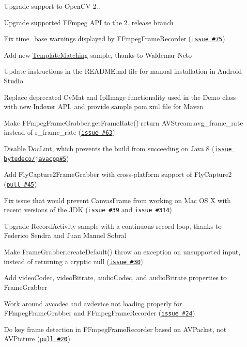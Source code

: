 
\begin{DoxyItemize}
\item Upgrade support to Open\+C\+V 2..
\item Upgrade supported F\+Fmpeg A\+P\+I to the 2. release branch
\item Fix {\ttfamily time\+\_\+base} warnings displayed by {\ttfamily F\+Fmpeg\+Frame\+Recorder} (\href{https://github.com/bytedeco/javacv/issues/75}{\tt issue \#75})
\item Add new {\ttfamily \hyperlink{class_template_matching}{Template\+Matching}} sample, thanks to Waldemar Neto
\item Update instructions in the {\ttfamily R\+E\+A\+D\+M\+E.\+md} file for manual installation in Android Studio
\item Replace deprecated {\ttfamily Cv\+Mat} and {\ttfamily Ipl\+Image} functionality used in the {\ttfamily Demo} class with new {\ttfamily Indexer} A\+P\+I, and provide sample {\ttfamily pom.\+xml} file for Maven
\item Make {\ttfamily F\+Fmpeg\+Frame\+Grabber.\+get\+Frame\+Rate()} return {\ttfamily A\+V\+Stream.\+avg\+\_\+frame\+\_\+rate} instead of {\ttfamily r\+\_\+frame\+\_\+rate} (\href{https://github.com/bytedeco/javacv/issues/63}{\tt issue \#63})
\item Disable Doc\+Lint, which prevents the build from succeeding on Java 8 (\href{https://github.com/bytedeco/javacpp/issues/5}{\tt issue bytedeco/javacpp\#5})
\item Add {\ttfamily Fly\+Capture2\+Frame\+Grabber} with cross-\/platform support of Fly\+Capture2 (\href{https://github.com/bytedeco/javacv/pull/45}{\tt pull \#45})
\item Fix issue that would prevent {\ttfamily Canvas\+Frame} from working on Mac O\+S X with recent versions of the J\+D\+K (\href{https://github.com/bytedeco/javacv/issues/39}{\tt issue \#39} and \href{http://code.google.com/p/javacv/issues/detail?id=314}{\tt issue \#314})
\item Upgrade {\ttfamily Record\+Activity} sample with a continuous record loop, thanks to Federico Sendra and Juan Manuel Sobral
\item Make {\ttfamily Frame\+Grabber.\+create\+Default()} throw an exception on unsupported input, instead of returning a cryptic {\ttfamily null} (\href{https://github.com/bytedeco/javacv/issues/30}{\tt issue \#30})
\item Add {\ttfamily video\+Codec}, {\ttfamily video\+Bitrate}, {\ttfamily audio\+Codec}, and {\ttfamily audio\+Bitrate} properties to {\ttfamily Frame\+Grabber}
\item Work around {\ttfamily avcodec} and {\ttfamily avdevice} not loading properly for {\ttfamily F\+Fmpeg\+Frame\+Grabber} and {\ttfamily F\+Fmpeg\+Frame\+Recorder} (\href{https://github.com/bytedeco/javacv/issues/24}{\tt issue \#24})
\item Do key frame detection in {\ttfamily F\+Fmpeg\+Frame\+Recorder} based on {\ttfamily A\+V\+Packet}, not {\ttfamily A\+V\+Picture} (\href{https://github.com/bytedeco/javacv/pull/20}{\tt pull \#20})
\end{DoxyItemize}

